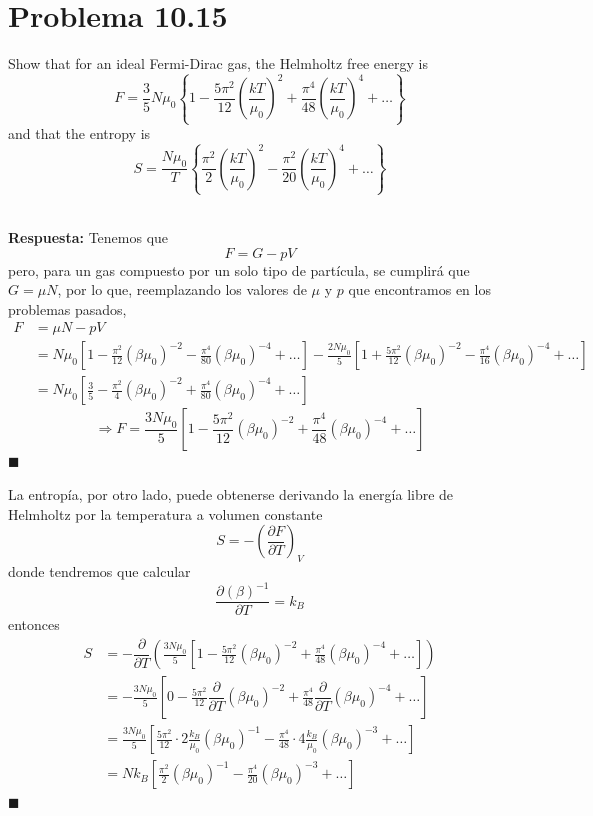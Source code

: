 \documentclass[]{article}
\numberwithin{equation}{section}
\newcommand{\deriv}[3]{\left(\frac{\partial #1}{\partial #2} \right)_{#3}}
\newcommand{\0}{\textcolor{gray}{0}}
\newcommand{\pd}[2]{\dfrac{\partial #1}{\partial #2}}
\newcommand{\qed}{\hfill\(\blacksquare\)}
\newcommand{\resp}{
	\\
	
	\textbf{Respuesta:} }
\begin{document}
\section{Problema 10.15}
Show that for an ideal Fermi-Dirac gas, the Helmholtz free energy is
\begin{equation}
	F = \frac{3}{5} N \mu_0 \left\{1 - \frac{5\pi^2}{12} \left(\frac{kT}{\mu_0}\right)^2 + \frac{\pi^4}{48} \left(\frac{kT}{\mu_0}\right)^4 + \ldots \right\}
\end{equation}
and that the entropy is
\begin{equation}
	S = \frac{N \mu_0}{T} \left\{\frac{\pi^2}{2} \left(\frac{kT}{\mu_0}\right)^2 - \frac{\pi^2}{20} \left(\frac{kT}{\mu_0}\right)^4 + \ldots \right\}
\end{equation}
\resp Tenemos que
\begin{equation*}
	F = G - pV
\end{equation*}
pero, para un gas compuesto por un solo tipo de partícula, se cumplirá que $G = \mu N$, por lo que, reemplazando los valores de $\mu$ y $p$ que encontramos en los problemas pasados,
\begin{align*}
	F &= \mu N - pV  \\
	&= N\mu_0 \left[1 - \frac{\pi ^2}{12} (\beta \mu_0)^{-2} - \frac{\pi ^4}{80} (\beta \mu_0)^{-4} + \ldots \right] - \frac{2 N \mu_0}{5} \left[1 + \frac{5 \pi^2}{12} (\beta \mu_0)^{-2} - \frac{\pi^4}{16} (\beta \mu_0)^{-4} + \ldots \right] \\
	&= N\mu_0 \left[\frac{3}{5} - \frac{\pi ^2}{4} (\beta \mu_0)^{-2} + \frac{\pi ^4}{80} (\beta \mu_0)^{-4} + \ldots \right]
\end{align*}
\begin{equation}
	\Rightarrow F = \frac{3 N\mu_0}{5} \left[1 - \frac{5 \pi ^2}{12} (\beta \mu_0)^{-2} + \frac{\pi ^4}{48} (\beta \mu_0)^{-4} + \ldots \right]
\end{equation}
\qed

La entropía, por otro lado, puede obtenerse derivando la energía libre de Helmholtz por la temperatura a volumen constante
\begin{equation*}
	S = -\deriv{F}{T}{V}
\end{equation*}
donde tendremos que calcular
\begin{equation*}
	\pd{(\beta)^{-1}}{T} = k_B
\end{equation*}
entonces
\begin{align}
	S &= -\pd{}{T} \left(\frac{3 N\mu_0}{5} \left[1 - \frac{5 \pi ^2}{12} (\beta \mu_0)^{-2} + \frac{\pi ^4}{48} (\beta \mu_0)^{-4} + \ldots \right]\right)\nonumber\\
	&= -\frac{3 N\mu_0}{5} \left[0 - \frac{5 \pi ^2}{12} \pd{}{T}(\beta \mu_0)^{-2} + \frac{\pi ^4}{48} \pd{}{T}(\beta \mu_0)^{-4} + \ldots \right]\nonumber\\
	&= \frac{3 N\mu_0}{5} \left[\frac{5 \pi ^2}{12} \cdot 2\frac{k_B}{\mu_0} (\beta \mu_0)^{-1} - \frac{\pi ^4}{48} \cdot 4 \frac{k_B}{\mu_0} (\beta \mu_0)^{-3} + \ldots \right]\nonumber\\
	&= N k_B \left[\frac{\pi ^2}{2} (\beta \mu_0)^{-1} - \frac{\pi ^4}{20} (\beta \mu_0)^{-3} + \ldots \right]
\end{align}
\qed
\end{document}
